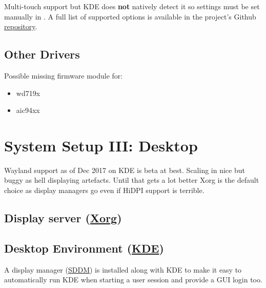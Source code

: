 Multi-touch support but KDE does \textbf{not} natively detect it so settings must be set manually in . A full list of supported options is available in the project's Github \href{https://github.com/p2rkw/xf86-input-mtrack}{repository}.


\subsection{Other Drivers}

Possible missing firmware module for:
\begin{itemize}[noitemsep,topsep=0pt,leftmargin=*]
	\item wd719x
	\item aic94xx
\end{itemize}


\section{System Setup III: Desktop}

Wayland support as of Dec 2017 on KDE is beta at best. Scaling in nice but buggy as hell displaying artefacts. Until that gets a lot better Xorg is the default choice as display managers go even if HiDPI support is terrible. 

\subsection{Display server (\href{https://wiki.archlinux.org/index.php/xorg}{Xorg})}


\subsection{Desktop Environment (\href{https://wiki.archlinux.org/index.php/KDE}{KDE})}

A display manager (\href{https://wiki.archlinux.org/index.php/SDDM}{SDDM}) is installed along with KDE to make it easy to automatically run KDE when starting a user session and provide a GUI login too.


